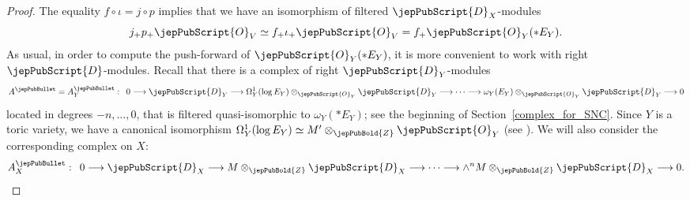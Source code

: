 \begin{proof}
The equality $f\circ\iota =j\circ p$ implies that we have an isomorphism of filtered $\jepPubScript{D}_X$-modules
$$j_+p_+\jepPubScript{O}_V\simeq f_+\iota_+\jepPubScript{O}_V=f_+\jepPubScript{O}_Y(*E_Y).$$
As usual, in order to compute the push-forward of $\jepPubScript{O}_Y(*E_Y)$, it is more convenient to work with right $\jepPubScript{D}$-modules.
Recall that there is a complex of right $\jepPubScript{D}_Y$-modules
$$A^\jepPubBullet = A_Y^{\jepPubBullet}:\,\,\,0 \longrightarrow \jepPubScript{D}_Y \longrightarrow \Omega_Y^1(\log E_Y) \otimes_{\jepPubScript{O}_Y} \jepPubScript{D}_Y \longrightarrow \cdots  \longrightarrow \omega_Y(E_Y) \otimes_{\jepPubScript{O}_Y} \jepPubScript{D}_Y \longrightarrow 0$$
located in degrees $-n,\ldots,0$, that is filtered quasi-isomorphic to $\omega_Y(*E_Y)$; see the beginning of Section~\ref{complex_for_SNC}. 
Since $Y$ is a toric variety, we have a canonical isomorphism 
$\Omega_Y^1(\log E_Y)\simeq M'\otimes_{\jepPubBold{Z}}\jepPubScript{O}_Y$ (see \cite[\S4.3]{Fulton}). 
We will also consider the corresponding complex on $X$:
$$A_X^{\jepPubBullet}:\,\,\,0\longrightarrow\jepPubScript{D}_X\longrightarrow M\otimes_{\jepPubBold{Z}}\jepPubScript{D}_X\longrightarrow \cdots\longrightarrow \wedge^nM\otimes_{\jepPubBold{Z}}\jepPubScript{D}_X\longrightarrow 0.$$


\end{proof}

